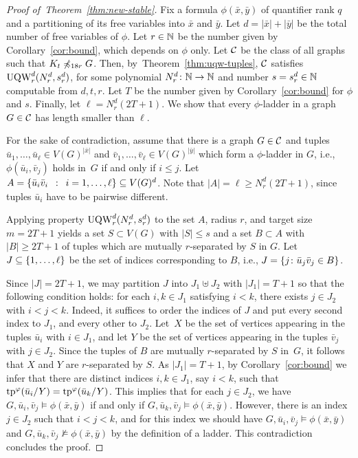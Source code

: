 \begin{proof}[Proof of~Theorem~\ref{thm:new-stable}]
Fix a formula $\phi(\bar x,\bar y)$ of quantifier rank $q$ and
a partitioning of its 
free variables into  $\bar x$ and $\bar y$.
Let $d=|\bar x|+|\bar y|$ be the total number of free variables of $\phi$.
Let $r\in \N$ be the number given by Corollary~\ref{cor:bound},
which depends on $\phi$ only.
Let $\cal C$ be the class of all graphs 
such that  $K_t\not\minor_{18r} G$.
Then, by~Theorem~\ref{thm:uqw-tuples}, 
$\cal C$ satisfies $\uqw^d_{r}(N^d_{r},s^d_r)$,
for some  polynomial  $N^d_r\from\N\to\N$ and number $s=s^d_r\in \N$ computable from $d,t,r$.
Let $T$ be the number given by Corollary~\ref{cor:bound} for $\phi$ and $s$.
 Finally, let 
$\ell=N^d_r(2T+1)$.
We show that 
every $\phi$-ladder in a graph $G\in\cal C$ has length smaller than $\ell$.

For the sake of contradiction, assume that there is a graph $G\in\cal C$
and tuples $\bar u_1,\ldots,\bar u_\ell\in V(G)^{|\bar x|}$ and $ \bar v_1,\ldots, \bar v_\ell\in V(G)^{|\bar y|}$
which form a $\phi$-ladder in $G$, i.e., 
$\phi(\bar u_i,\bar v_j)$ holds in~$G$ if and only if $i\le j$.
	Let $A=\setof{ \bar u_i \bar v_i}{i=1,\ldots,\ell}\subset V(G)^d$. Note that $|A|=\ell\ge N^d_r(2T+1)$, since tuples $\bar u_i$ have to be pairwise different.
  
Applying property  $\uqw^d_r(N^d_r,s^d_r)$ to the set $A$, radius $r$, and target size $m=2T+1$
		 yields a set $S\subset V(G)$ with $|S|\le s$
	and a set $B\subset A$ with $|B|\geq 2T+1$ 
  of tuples which are  mutually $r$-separated by $S$  in $G$.
  Let $J\subseteq \set{1,\ldots,\ell}$
  be the set of indices corresponding to $B$,
  i.e., $J=\set{j\colon\bar u_j\bar v_j\in B}$.
  
  Since $|J|=2T+1$, we may partition $J$ into $J_1\uplus J_2$ with $|J_1|=T+1$ so that the following condition holds:
  for each $i,k\in J_1$ satisfying $i<k$, there exists $j\in J_2$ with $i<j<k$. Indeed, it suffices to order the indices of $J$ and put every second index to $J_1$, and every other to $J_2$.
  Let~$X$ be the set of vertices appearing in the tuples $\bar u_i$ with $i\in J_1$, and let $Y$ be the set of vertices appearing in the tuples $\bar v_j$ with $j\in J_2$.
  Since the tuples of $B$ are mutually $r$-separated by $S$ in~$G$, it follows that $X$ and $Y$ are $r$-separated by $S$.
  As $|J_1|=T+1$, by Corollary~\ref{cor:bound} we infer that there are distinct indices $i,k\in J_1$, say $i<k$, such that $\tp^\phi(\bar u_i/Y)=
    \tp^\phi(\bar u_{k}/Y)$. This implies that for each $j\in J_2$, we have $G,\bar u_i,\bar v_j\models \phi(\bar x,\bar y)$ if and only if $G,\bar u_{k},\bar v_j\models \phi(\bar x,\bar y)$.
    However, there is an index $j\in J_2$ such that $i<j<k$, and for this index we should have $G,\bar u_i,\bar v_j\models \phi(\bar x,\bar y)$ and $G,\bar u_{k},\bar v_j\not\models \phi(\bar x,\bar y)$
    by the definition of a ladder. This contradiction concludes the proof.
\end{proof}

